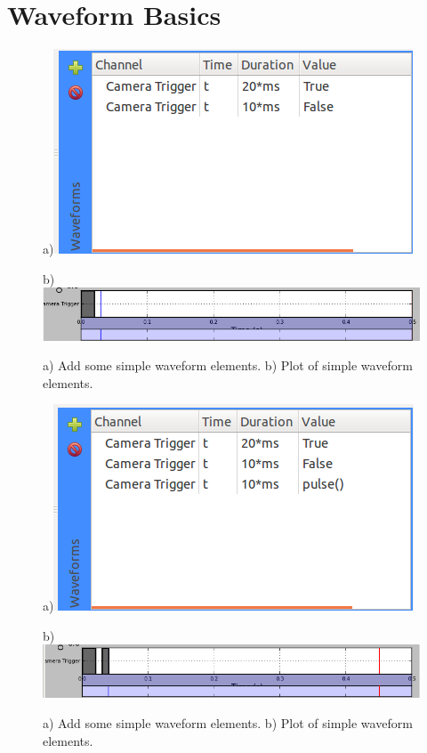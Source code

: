\thispagestyle{fancy}
\pagestyle{fancy}

\section{Waveform Basics}

\begin{figure}[ht]
  \centerline{a)\includegraphics[width=.5\textwidth]{figures/waveform-0}}
  \centerline{b)\includegraphics[width=.8\textwidth]{figures/plot-0}}
  \caption[Very simple waveform]{
    a) Add some simple waveform elements.
    b) Plot of simple waveform elements.
  }
  \label{fig:quick:waveform-0}
\end{figure}

\begin{figure}[ht]
  \centerline{a)\includegraphics[width=.5\textwidth]{figures/waveform-1}}
  \centerline{b)\includegraphics[width=.8\textwidth]{figures/plot-1}}
  \caption{a) Add some simple waveform elements. b) Plot of simple
  waveform elements.}
  \label{fig:quick:waveform-1}
\end{figure}

